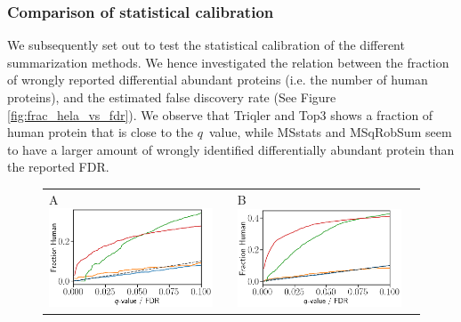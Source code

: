 \documentclass[10pt,letterpaper]{article}
\begin{document}
\subsubsection*{Comparison of statistical calibration}

We subsequently set out to test the statistical calibration of the different summarization methods. We hence investigated the relation between the fraction of wrongly reported differential abundant proteins (i.e. the number of human proteins), and the estimated false discovery rate (See Figure \ref{fig:frac_hela_vs_fdr}). We observe that Triqler and Top3 shows a fraction of human protein that is close to the $q$~value, while MSstats and  MSqRobSum seem to have a larger amount of wrongly identified differentially abundant protein than the reported FDR. 

\begin{figure}[hbt]
    \centering
    \centering
    \begin{tabular}{lclc} 
        A \includegraphics[width=0.5\linewidth]{../../result/report_plots/osw_FP_DE_all.png} & &%
        B \includegraphics[width=0.5\linewidth]{../../result/report_plots/diann_FP_DE_all.png} & \\%

\end{tabular}
\end{figure}
\end{document}
